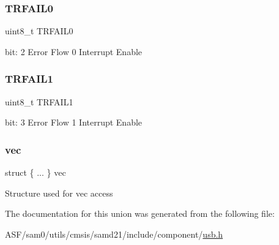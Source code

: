 \subsubsection{\texorpdfstring{TRFAIL0}{TRFAIL0}}
{\footnotesize\ttfamily uint8\+\_\+t T\+R\+F\+A\+I\+L0}

bit\+: 2 Error Flow 0 Interrupt Enable \mbox{\label{union_u_s_b___d_e_v_i_c_e___e_p_i_n_t_e_n_s_e_t___type_a25eefecf91be8facebc4c383e2339b9b}} 
\subsubsection{\texorpdfstring{TRFAIL1}{TRFAIL1}}
{\footnotesize\ttfamily uint8\+\_\+t T\+R\+F\+A\+I\+L1}

bit\+: 3 Error Flow 1 Interrupt Enable \mbox{\label{union_u_s_b___d_e_v_i_c_e___e_p_i_n_t_e_n_s_e_t___type_afdde63f46b3853285fb418957c29257b}} 
\subsubsection{\texorpdfstring{vec}{vec}}
{\footnotesize\ttfamily struct \{ ... \}   vec}

Structure used for vec access 

The documentation for this union was generated from the following file\+:\begin{DoxyCompactItemize}
\item 
A\+S\+F/sam0/utils/cmsis/samd21/include/component/\mbox{\hyperlink{component_2usb_8h}{usb.\+h}}\end{DoxyCompactItemize}
